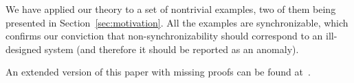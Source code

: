 We have applied our theory to a set of nontrivial examples, two of them being presented in Section~\ref{sec:motivation}. 
All the examples are synchronizable, which confirms our conviction that non-synchronizability should correspond to an ill-designed system (and therefore it should be reported as an anomaly).

An extended version of this paper with missing proofs can be found at~\cite{arxiv}.
\vspace{-2mm}


%
%
%
%
%
%
